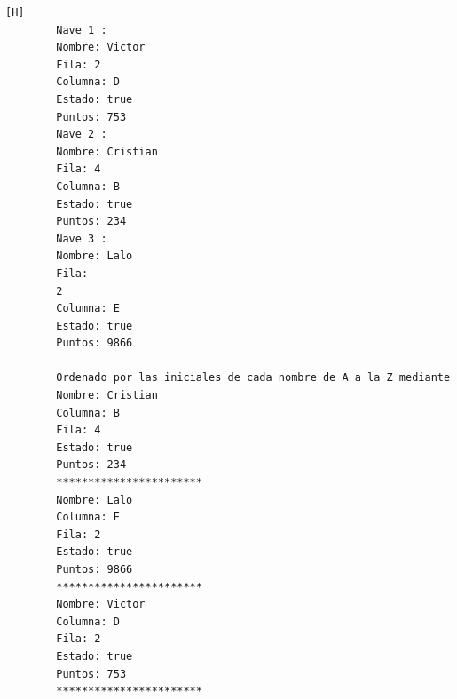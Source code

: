 \documentclass{article}
\begin{document}
    \begin{lstlisting}[language=bash,caption={La ejecucion dada:}][H]
		Nave 1 : 
		Nombre: Victor
		Fila: 2
		Columna: D
		Estado: true
		Puntos: 753
		Nave 2 : 
		Nombre: Cristian
		Fila: 4
		Columna: B
		Estado: true
		Puntos: 234
		Nave 3 : 
		Nombre: Lalo
		Fila: 
		2
		Columna: E
		Estado: true
		Puntos: 9866
            
		Ordenado por las iniciales de cada nombre de A a la Z mediante el metodo seleccion: 
		Nombre: Cristian
		Columna: B
		Fila: 4
		Estado: true
		Puntos: 234
		***********************
		Nombre: Lalo
		Columna: E
		Fila: 2
		Estado: true
		Puntos: 9866
		***********************
		Nombre: Victor
		Columna: D
		Fila: 2
		Estado: true
		Puntos: 753
		***********************

    \end{lstlisting}	
\end{document}
